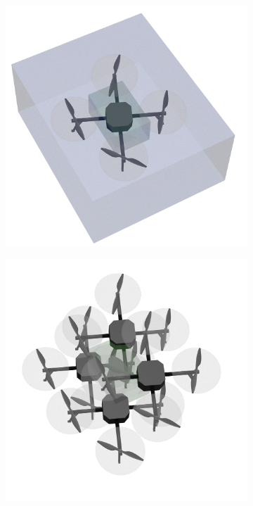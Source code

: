 \begin{figure}[htp]
    \begin{subfigure}{0.4\textwidth}
        \centering
        \includegraphics[width=\linewidth]{figures/appendix/CCdrone1.png}
        \caption{}
        \vspace{-0.3cm}
        \label{fig:CC3}
    \end{subfigure}
    \begin{subfigure}{0.4\textwidth}
        \centering
        \includegraphics[width=\linewidth]{figures/appendix/CCdrone2.png}
        \caption{}
        \vspace{-0.3cm}
        \label{fig:CCall}
    \end{subfigure}


\end{figure}
